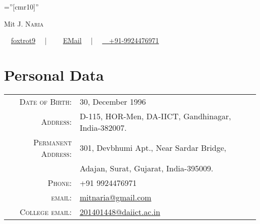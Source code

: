 \documentclass[a4paper,10pt]{article}
\begin{document}
\font\fb=''[cmr10]'' %


\par{\centering
	{\Huge Mit \textsc{J. Naria}}
\par}


\begin{center}
		\faGithub \ \ \href{https://github.com/foxtrot9/}{foxtrot9} \ \
		| \ \ \faEnvelope \ \ \href{mailto:mitnaria@gmail.com}{EMail} \ \
		| \ \ \href{}{\faPhone \ \ +91-9924476971} \ \
		\bigskip %
\end{center}


\section{Personal Data}
\begin{tabular}{rl}
	\textsc{Date of Birth:} & 30, December 1996 \\
	\textsc{Address:}   & D-115, HOR-Men, DA-IICT, Gandhinagar, India-382007. \\
	\textsc{Permanent Address:} & 301, Devbhumi Apt., Near Sardar Bridge, \\
	& Adajan, Surat, Gujarat, India-395009. \\
	\textsc{Phone:}     & +91 9924476971\\
	\textsc{email:}     & \href{mailto:mitnaria@gmail.com}{mitnaria@gmail.com} \\
	\textsc{College email:} & \href{mailto:201401448@daiict.ac.in}{201401448@daiict.ac.in} \\
\end{tabular}


\end{document}
